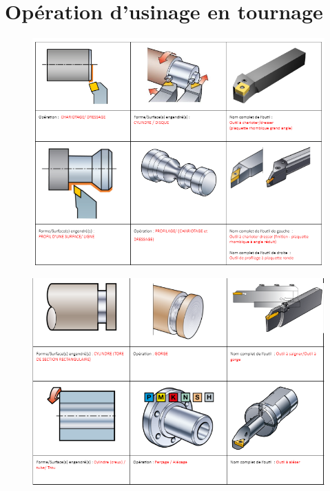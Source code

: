 \documentclass[
	11pt, %
	fleqn, %
	a4paper, %
]{LegrandOrangeBook}
\begin{document}
\section{Opération d'usinage en tournage}
\begin{figure}[H] %
	\centering %

	\includegraphics[width=1\textwidth]{Images/CORR21.png} %

	\label{fig:placeholder} %

\end{figure}


\begin{figure}[H] %
	\centering %

	\includegraphics[width=1\textwidth]{Images/CORR22.png} %

	\label{fig:placeholder} %
\end{figure}
\end{document}
